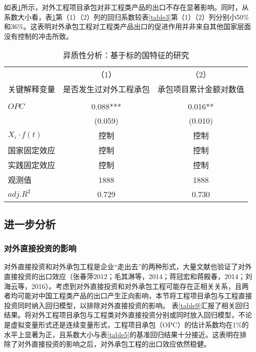 \documentclass[a4paper,12pt]{article}
\newcommand{\upcite}[1]{\textsuperscript{\textsuperscript{\cite{#1}}}}
\newcommand{\sym}[1]{#1}
\begin{document}
\vspace{0.5em}  %

如表\ref{table8}所示，对外工程项目承包对非工程类产品的出口不存在显著影响。同时，从系数大小看，表\ref{table8}第（1）（2）列的回归系数较表\ref{table3}第（1）（2）列分别小50\%和36\%。这表明对外承包工程对工程类产品出口的促进作用并非来自其他国家层面没有控制的冲击所致。

\begin{table} [ht] \footnotesize
	\newcommand{\tabincell}[2]{\begin{tabular}{@{}#1@{}}#2\end{tabular}}  %
	\centering
	\captionsetup{labelformat=default,labelsep=period}
	\caption{异质性分析：基于标的国特征的研究}\label{table8}
	\begin{tabular}{lcc}
		\toprule
		&（1）&（2）\\
		关键解释变量	&是否发生过对外工程承包&承包项目累计金额对数值 \\	
		\cline{1-3} \\
		\vspace{0.05em}  %
		$OPC$ &0.088\sym{***} & 0.016\sym{**} \\
		&(0.059)   	  &(0.010)     \\
		$X_{i}·f(t)$  & 控制&控制   \\
		国家固定效应  & 控制&控制  \\
		实践固定效应  & 控制&控制   \\
		观测值 &1888&1888\\
		$adj.R^{2}$ &0.729&	0.730\\
		\bottomrule
	\end{tabular}
\end{table}

\subsection{进一步分析}
\subsubsection{对外直接投资的影响}
对外直接投资和对外承包工程是企业“走出去”的两种形式，大量文献也验证了对外直接投资的出口效应（张春萍2012；毛其淋等，2014；蒋冠宏和蒋殿春，2014；刘海云等，2016）\upcite{ref13}\upcite{ref14}\upcite{ref15}\upcite{ref16}。考虑到对外直接投资和对外承包工程可能存在正相关关系，且两者均可能对中国工程类产品的出口产生正向影响，本节将工程项目承包与工程直接投资同时纳入回归模型，以排除对外直接投资的影响。
表\ref{table9}汇报了相关回归结果。将对外工程项目承包与工程类对外直接投资分别或同时放入回归模型，不论是虚拟变量形式还是连续变量形式，工程项目承包（OPC）的估计系数均在1\%的水平上显著为正，且系数大小与表\ref{table5}的基准回归结果十分接近。这表明在排除了对外直接投资的影响之后，对外承包工程的出口效应依然稳健。
\end{document}
